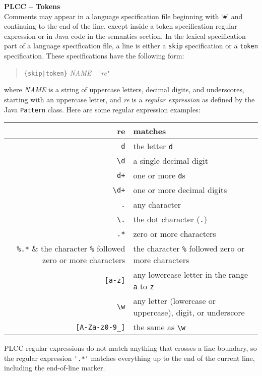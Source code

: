\begin{minipage}[t]{\sw}
\slidenumber
\LARGE
{\bf PLCC -- Tokens}\\
\Large
Comments may appear in a language specification file
beginning with `\verb'#'' and continuing to the end of the line,
except inside a token specification regular expression
or in Java code in the semantics section.\exx
In the lexical specification part of a language specification file,
a line is either
a \verb'skip' specification or a \verb'token' specification.
These specifications have the following form:
\begin{quote}
\verb'{skip|token}' {\em NAME} \verb. '.{\em re}\verb.'.
\end{quote}
where {\em NAME} is a string of uppercase letters, decimal digits,
and underscores,
starting with an uppercase letter,
and {\em re} is a {\em regular expression}
as defined by the Java \verb'Pattern' class.\exx
Here are some regular expression examples:

\begin{center}
\large
\begin{tabular}{r|l}
{\bf re} & {\bf matches} \\ \hline
\verb'd' & the letter \verb'd' \\
\verb'\d' & a single decimal digit \\
\verb'd+' & one or more \verb'd's \\
\verb'\d+' & one or more decimal digits \\
\verb'.' & any character \\
\verb'\.' & the dot character (\verb'.') \\
\verb'.*' & zero or more characters \\
\verb'%.*' & the character \verb'%' followed zero or more characters \\
\verb'[a-z]' & any lowercase letter in the range \verb'a' to \verb'z' \\
\verb'\w'  & any letter (lowercase or uppercase), digit, or underscore \\
\verb'[A-Za-z0-9_]' & the same as \verb'\w' \\
\end{tabular}
\end{center}

\Large
PLCC regular expressions do not match anything that crosses a line boundary,
so the regular expression \verb?'.*'? matches everything
up to the end of the current line, including the end-of-line marker.
\end{minipage}
\clearpage
